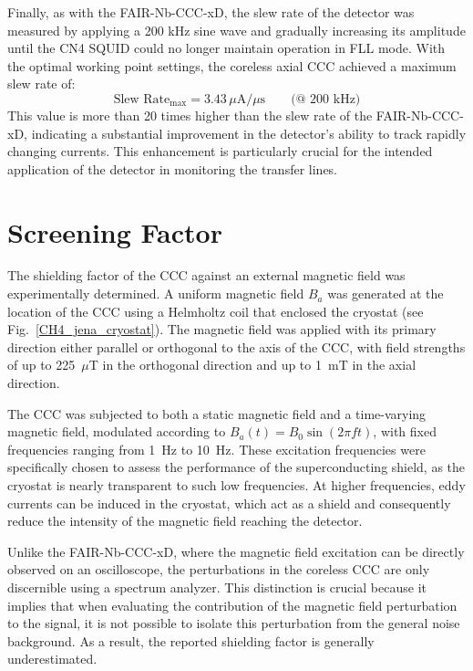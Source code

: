 \documentclass[12pt,a4paper]{report}
\begin{document}
        Finally, as with the FAIR-Nb-CCC-xD, the slew rate of the detector was measured by applying a 200 kHz sine wave and gradually increasing its amplitude until the CN4 SQUID could no longer maintain operation in FLL mode. With the optimal working point settings, the coreless axial CCC achieved a maximum slew rate of:
        \begin{equation}
        	\text{Slew Rate}_{\text{max}} = 3.43\,\mu\text{A}/\mu\text{s} \qquad \text{(@ 200 kHz)}
        \end{equation}
        This value is more than 20 times higher than the slew rate of the FAIR-Nb-CCC-xD, indicating a substantial improvement in the detector's ability to track rapidly changing currents. This enhancement is particularly crucial for the intended application of the detector in monitoring the transfer lines.
        
        
        
        \section{Screening Factor}
        The shielding factor of the CCC against an external magnetic field was experimentally determined. A uniform magnetic field $B_a$ was generated at the location of the CCC using a Helmholtz coil that enclosed the cryostat (see Fig.~\ref{CH4_jena_cryostat}). The magnetic field was applied with its primary direction either parallel or orthogonal to the axis of the CCC, with field strengths of up to 225~$\mu$T in the orthogonal direction and up to 1~mT in the axial direction. 
        
        The CCC was subjected to both a static magnetic field and a time-varying magnetic field, modulated according to $B_a(t) = B_0\sin(2\pi f t)$, with fixed frequencies ranging from 1~Hz to 10~Hz. These excitation frequencies were specifically chosen to assess the performance of the superconducting shield, as the cryostat is nearly transparent to such low frequencies. At higher frequencies, eddy currents can be induced in the cryostat, which act as a shield and consequently reduce the intensity of the magnetic field reaching the detector.
        
        Unlike the FAIR-Nb-CCC-xD, where the magnetic field excitation can be directly observed on an oscilloscope, the perturbations in the coreless CCC are only discernible using a spectrum analyzer. This distinction is crucial because it implies that when evaluating the contribution of the magnetic field perturbation to the signal, it is not possible to isolate this perturbation from the general noise background. As a result, the reported shielding factor is generally underestimated.
        
\end{document}
